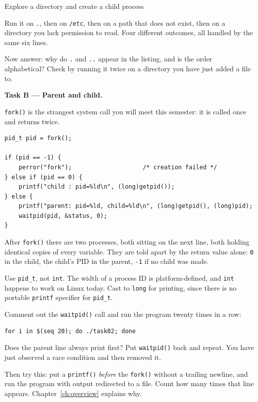 \begin{labproject}{Explore a directory and create a child process}
\begin{tryit}
Run it on \texttt{.}, then on \texttt{/etc}, then on a path that does not exist, then on a directory you lack permission to read. Four different outcomes, all handled by the same six lines.

Now answer: why do \texttt{.} and \texttt{..} appear in the listing, and is the order alphabetical? Check by running it twice on a directory you have just added a file to.
\end{tryit}

\medskip\noindent\textbf{Task B --- Parent and child.}\par
\texttt{fork()} is the strangest system call you will meet this semester: it is called once and returns twice.

\begin{lstlisting}[style=osc]
pid_t pid = fork();

if (pid == -1) {
    perror("fork");                    /* creation failed */
} else if (pid == 0) {
    printf("child : pid=%ld\n", (long)getpid());
} else {
    printf("parent: pid=%ld, child=%ld\n", (long)getpid(), (long)pid);
    waitpid(pid, &status, 0);
}
\end{lstlisting}

After \texttt{fork()} there are two processes, both sitting on the next line, both holding identical copies of every variable. They are told apart by the return value alone: \texttt{0} in the child, the child's PID in the parent, \texttt{-1} if no child was made.

\begin{pitfall}
Use \texttt{pid\_t}, not \texttt{int}. The width of a process ID is platform-defined, and \texttt{int} happens to work on Linux today. Cast to \texttt{long} for printing, since there is no portable \texttt{printf} specifier for \texttt{pid\_t}.
\end{pitfall}

\begin{tryit}
Comment out the \texttt{waitpid()} call and run the program twenty times in a row:
\begin{lstlisting}[style=osbash]
for i in $(seq 20); do ./task02; done
\end{lstlisting}
Does the parent line always print first? Put \texttt{waitpid()} back and repeat. You have just observed a race condition and then removed it.

Then try this: put a \texttt{printf()} \emph{before} the \texttt{fork()} without a trailing newline, and run the program with output redirected to a file. Count how many times that line appears. Chapter~\ref{ch:overview} explains why.
\end{tryit}
\end{labproject}

